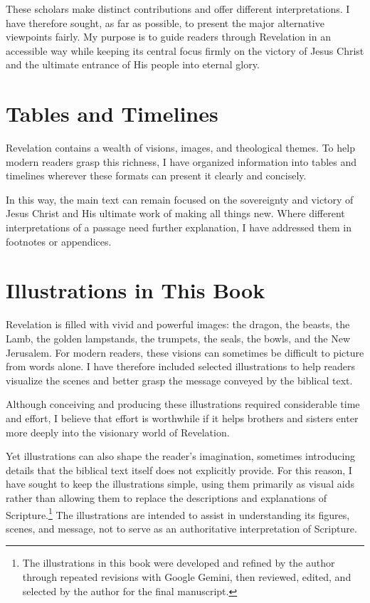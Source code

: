 These scholars make distinct contributions and offer different interpretations. I have therefore sought, as far as possible, to present the major alternative viewpoints fairly. My purpose is to guide readers through Revelation in an accessible way while keeping its central focus firmly on the victory of Jesus Christ and the ultimate entrance of His people into eternal glory.

\section*{Tables and Timelines}

Revelation contains a wealth of visions, images, and theological themes. To help modern readers grasp this richness, I have organized information into tables and timelines wherever these formats can present it clearly and concisely.

In this way, the main text can remain focused on the sovereignty and victory of Jesus Christ and His ultimate work of making all things new. Where different interpretations of a passage need further explanation, I have addressed them in footnotes or appendices.

\section*{Illustrations in This Book}

Revelation is filled with vivid and powerful images: the dragon, the beasts, the Lamb, the golden lampstands, the trumpets, the seals, the bowls, and the New Jerusalem. For modern readers, these visions can sometimes be difficult to picture from words alone. I have therefore included selected illustrations to help readers visualize the scenes and better grasp the message conveyed by the biblical text.

Although conceiving and producing these illustrations required considerable time and effort, I believe that effort is worthwhile if it helps brothers and sisters enter more deeply into the visionary world of Revelation.

Yet illustrations can also shape the reader's imagination, sometimes introducing details that the biblical text itself does not explicitly provide. For this reason, I have sought to keep the illustrations simple, using them primarily as visual aids rather than allowing them to replace the descriptions and explanations of Scripture.\footnote{The illustrations in this book were developed and refined by the author through repeated revisions with Google Gemini, then reviewed, edited, and selected by the author for the final manuscript.}
The illustrations are intended to assist in understanding its figures, scenes, and message, not to serve as an authoritative interpretation of Scripture.

